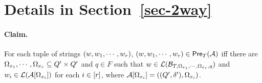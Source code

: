 
\section{Details in Section~\ref{sec-2way}} \label{appendix:sec-2way}

\paragraph{Claim.} For each tuple of strings $(w, w_1,\cdots, w_r)$, $(w, w_1,\cdots, w_r) \in \textsf{Pre}_{T}(\mathcal{A})$ iff there are $\Omega_{x_1}, \cdots, \Omega_{x_r} \subseteq Q' \times Q'$ and $q \in F$ such that $w \in \mathcal{L}(\mathcal{B}_{T, \Omega_{x_1}, \cdots, \Omega_{x_r}, q})$ and $w_i \in \mathcal{L}(\mathcal{A}[\Omega_{x_i}])$ for each $i \in [r]$, where $\mathcal{A}[\Omega_{x_i}]=((Q', \delta'), \Omega_{x_i})$.

